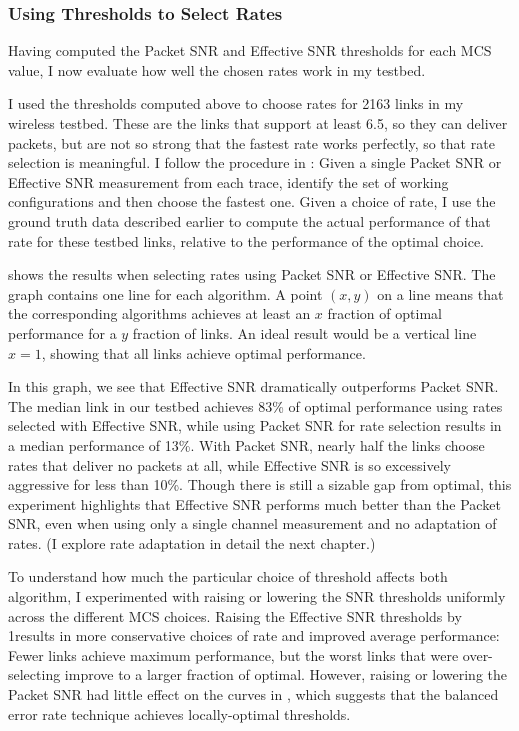\subsubsection{Using Thresholds to Select Rates}
Having computed the Packet SNR and Effective SNR thresholds for each MCS value, I now evaluate how well the chosen rates work in my testbed.

I used the thresholds computed above to choose rates for 2163 links in my wireless testbed. These are the links that support at least 6.5\Mbps, so they can deliver packets, but are not so strong that the fastest rate works perfectly, so that rate selection is meaningful. I follow the procedure in : Given a single Packet SNR or Effective SNR measurement from each trace, identify the set of working configurations and then choose the fastest one. Given a choice of rate, I use the ground truth data described earlier to compute the actual performance of that rate for these testbed links, relative to the performance of the optimal choice.

 shows the results when selecting rates using Packet SNR or Effective SNR. The graph contains one line for each algorithm. A point $(x,y)$ on a line means that the corresponding algorithms achieves at least an $x$ fraction of optimal performance for a $y$ fraction of links. An ideal result would be a vertical line $x=1$, showing that all links achieve optimal performance.

In this graph, we see that Effective SNR dramatically outperforms Packet SNR. The median link in our testbed achieves 83\% of optimal performance using rates selected with Effective SNR, while using Packet SNR for rate selection results in a median performance of 13\%. With Packet SNR, nearly half the links choose rates that deliver no packets at all, while Effective SNR is so excessively aggressive for less than 10\%. Though there is still a sizable gap from optimal, this experiment highlights that Effective SNR performs much better than the Packet SNR, even when using only a single channel measurement and no adaptation of rates. (I explore rate adaptation in detail the next chapter.)

To understand how much the particular choice of threshold affects both algorithm, I experimented with raising or lowering the SNR thresholds uniformly across the different MCS choices. Raising the Effective SNR thresholds by 1\dB results in more conservative choices of rate and improved average performance: Fewer links achieve maximum performance, but the worst links that were over-selecting improve to a larger fraction of optimal. However, raising or lowering the Packet SNR had little effect on the curves in , which suggests that the balanced error rate technique achieves locally-optimal thresholds.

